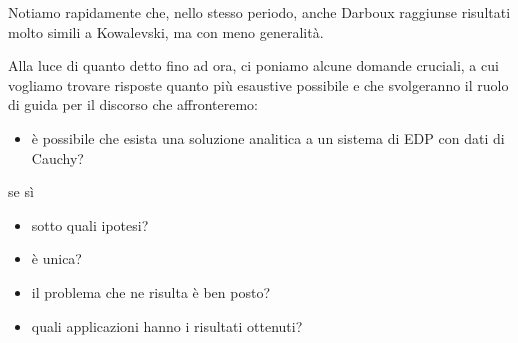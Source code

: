 Notiamo rapidamente che, nello stesso periodo, anche Darboux raggiunse risultati molto simili a Kowalevski, ma con meno generalità.

Alla luce di quanto detto fino ad ora, ci poniamo alcune domande cruciali, a cui vogliamo trovare risposte quanto più esaustive possibile e che svolgeranno il ruolo di guida per il discorso che affronteremo:
\begin{itemize}
\item è possibile che esista una soluzione analitica a un sistema di EDP con dati di Cauchy?
\end{itemize}
se sì
\begin{itemize}
\item sotto quali ipotesi?
\item è unica?
\item il problema che ne risulta è ben posto?
\item quali applicazioni hanno i risultati ottenuti?
\end{itemize}



